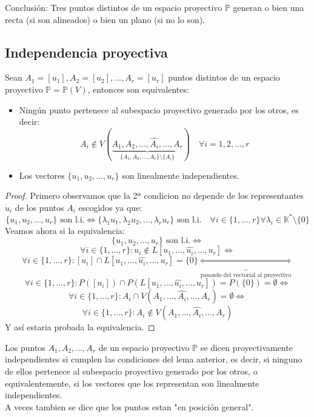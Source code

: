 Conclusión: Tres puntos distintos de un espacio proyectivo $\mathbb{P}$ generan o bien una recta (si son alineados) o bien un plano (si no lo son).

\subsection{Independencia proyectiva}

\begin{lema}
    Sean $A_1 = [u_1], A_2 = [u_2], \ldots, A_r = [u_r]$ puntos distintos de un espacio proyectivo $\mathbb{P} = \mathbb{P}(V)$, entonces son equivalentes:
    \begin{itemize}
        \item[1)] Ningún punto pertenece al subespacio proyectivo generado por los otros, es decir:
        \[
        A_i \notin V(\underbrace{A_1, A_2, \ldots, \hat{A_i}, \ldots, A_r}_{\{A_1, A_2, \ldots, A_r\} \setminus \{A_i\}}) \quad \forall i=1,2,\ldots,r
        \]
        \item[2)] Los vectores $\{u_1, u_2, \ldots, u_r\}$ son linealmente independientes.
    \end{itemize}
\end{lema}

\begin{proof}
    Primero observamos que la 2ª condicion no depende de los representantes $u_i$ de los puntos $A_i$ escogidos ya que:
    \[
    \{u_1, u_2, \ldots, u_r\} \text{ son l.i.} \iff \{\lambda_1 u_1, \lambda_2 u_2, \ldots, \lambda_r u_r\} \text{ son l.i.} \quad \forall i \in \{1, \ldots, r\} \forall \lambda_i \in \mathbb{K}^* \setminus \{0\}
    \]
    Veamos ahora si la equivalencia:
    \[
    \{u_1, u_2, \ldots, u_r\} \text{ son l.i.} \iff
    \]
    \[
    \forall i \in \{1, \ldots, r\} : u_i \notin L[u_1, \ldots, \hat{u_i}, \ldots, u_r] \iff
    \]
    \[
    \forall i \in \{1, \ldots, r\} : [u_i] \cap L[u_1, \ldots, \hat{u_i}, \ldots, u_r] = \{0\} \underbrace{\iff}_{\text{pasando del vectorial al proyectivo}} 
    \]
    \[
    \forall i \in \{1, \ldots, r\} : P([u_i]) \cap P(L[u_1, \ldots, \hat{u_i}, \ldots, u_r]) = P(\{0\}) = \emptyset \iff
    \]
    \[
    \forall i \in \{1, \ldots, r\} : A_i \cap V(A_1, \ldots, \hat{A_i}, \ldots, A_r) = \emptyset \iff
    \]
    \[
    \forall i \in \{1, \ldots, r\} : A_i \notin V(A_1, \ldots, \hat{A_i}, \ldots, A_r)
    \]
    Y así estaria probada la equivalencia.
\end{proof}

\begin{definición}
    Los puntos $A_1, A_2, \ldots, A_r$ de un espacio proyectivo $\mathbb{P}$ se dicen proyectivamente independientes si cumplen las condiciones del lema anterior, es decir, si ninguno de ellos pertenece al subespacio proyectivo generado por los otros, o equivalentemente, si los vectores que los representan son linealmente independientes.\\
    A veces tambien se dice que los puntos estan "en posición general".
\end{definición}

